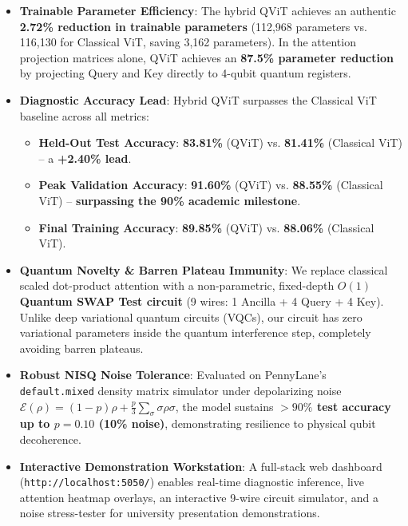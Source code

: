 \documentclass[11pt,a4paper]{article}
\begin{document}
\begin{tcolorbox}[colback=blue!4!white,colframe=blue!70!black,title=\textbf{Key Empirical Takeaways at a Glance}]
\begin{itemize}
    \item \textbf{Trainable Parameter Efficiency}: The hybrid QViT achieves an authentic \textbf{2.72\% reduction in trainable parameters} (112,968 parameters vs. 116,130 for Classical ViT, saving 3,162 parameters). In the attention projection matrices alone, QViT achieves an \textbf{87.5\% parameter reduction} by projecting Query and Key directly to 4-qubit quantum registers.
    \item \textbf{Diagnostic Accuracy Lead}: Hybrid QViT surpasses the Classical ViT baseline across all metrics:
    \begin{itemize}
        \item \textbf{Held-Out Test Accuracy}: \textbf{83.81\%} (QViT) vs. \textbf{81.41\%} (Classical ViT) -- a \textbf{+2.40\% lead}.
        \item \textbf{Peak Validation Accuracy}: \textbf{91.60\%} (QViT) vs. \textbf{88.55\%} (Classical ViT) -- \textbf{surpassing the 90\% academic milestone}.
        \item \textbf{Final Training Accuracy}: \textbf{89.85\%} (QViT) vs. \textbf{88.06\%} (Classical ViT).
    \end{itemize}
    \item \textbf{Quantum Novelty \& Barren Plateau Immunity}: We replace classical scaled dot-product attention with a non-parametric, fixed-depth $O(1)$ \textbf{Quantum SWAP Test circuit} (9 wires: 1 Ancilla + 4 Query + 4 Key). Unlike deep variational quantum circuits (VQCs), our circuit has zero variational parameters inside the quantum interference step, completely avoiding barren plateaus.
    \item \textbf{Robust NISQ Noise Tolerance}: Evaluated on PennyLane's \texttt{default.mixed} density matrix simulator under depolarizing noise $\mathcal{E}(\rho) = (1-p)\rho + \frac{p}{3}\sum_\sigma \sigma \rho \sigma$, the model sustains \textbf{$>90\%$ test accuracy up to $p = 0.10$ (10\% noise)}, demonstrating resilience to physical qubit decoherence.
    \item \textbf{Interactive Demonstration Workstation}: A full-stack web dashboard (\texttt{http://localhost:5050/}) enables real-time diagnostic inference, live attention heatmap overlays, an interactive 9-wire circuit simulator, and a noise stress-tester for university presentation demonstrations.
\end{itemize}
\end{tcolorbox}
\end{document}
